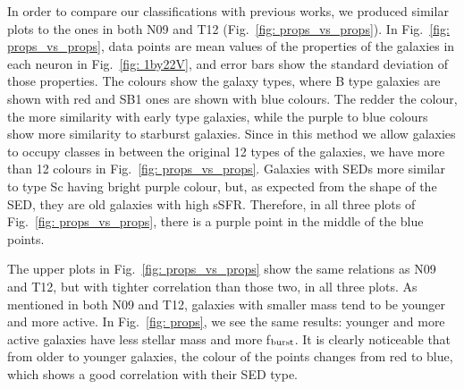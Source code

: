         In order to compare our classifications with previous works, we produced similar plots to the ones in both N09 and T12 (Fig.~\ref{fig: props_vs_props}).
        In Fig.~\ref{fig: props_vs_props}, data points are mean values of the properties of the galaxies in each neuron in Fig.~\ref{fig: 1by22V}, and error bars show the standard deviation of those properties. 
        The colours show the galaxy types, where B type galaxies are shown with red and SB1 ones are shown with blue colours.
        The redder the colour, the more similarity with early type galaxies, while the purple to blue colours show more similarity to starburst galaxies.
        Since in this method we allow galaxies to occupy classes in between the original 12 types of the galaxies, we have more than 12 colours in Fig.~\ref{fig: props_vs_props}.
        Galaxies with SEDs more similar to type Sc having bright purple colour, but, as expected from the shape of the SED, they are old galaxies with high sSFR.
        Therefore, in all three plots of Fig.~\ref{fig: props_vs_props}, there is a purple point in the middle of the blue points.
        
        The upper plots in Fig.~\ref{fig: props_vs_props} show the same relations as N09 and T12, but with tighter correlation than those two, in all three plots.
        As mentioned in both N09 and T12, galaxies with smaller mass tend to be younger and more active.
        In Fig.~\ref{fig: props}, we see the same results: younger and more active galaxies have less stellar mass and more f$_{\rm {burst}}$.
        It is clearly noticeable that from older to younger galaxies, the colour of the points changes from red to blue, which shows a good correlation with their SED type.
        
